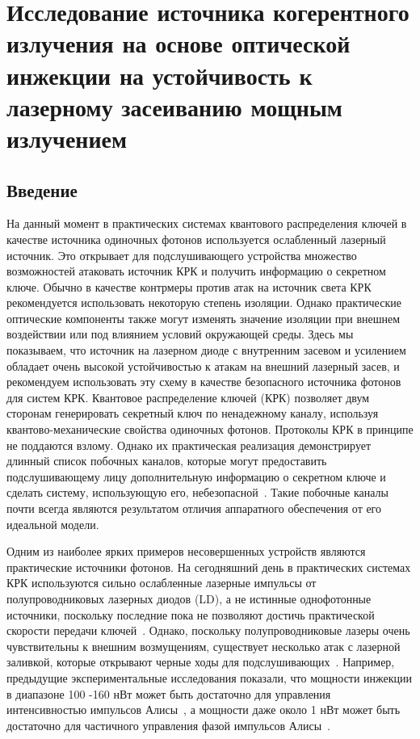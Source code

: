 \chapter{Исследование источника когерентного излучения на основе оптической инжекции на устойчивость к лазерному засеиванию мощным излучением}\label{ch:ch5}
\section{Введение}
На данный момент в практических системах квантового распределения ключей в качестве источника одиночных фотонов используется ослабленный лазерный источник. Это открывает для подслушивающего устройства множество возможностей атаковать источник КРК и получить информацию о секретном ключе. Обычно в качестве контрмеры против атак на источник света КРК рекомендуется использовать некоторую степень изоляции. Однако практические оптические компоненты также могут изменять значение изоляции при внешнем воздействии или под влиянием условий окружающей среды. Здесь мы показываем, что источник на лазерном диоде с внутренним засевом и усилением обладает очень высокой устойчивостью к атакам на внешний лазерный засев, и рекомендуем использовать эту схему в качестве безопасного источника фотонов для систем КРК.
Квантовое распределение ключей (КРК) позволяет двум сторонам генерировать секретный ключ по ненадежному каналу, используя квантово-механические свойства одиночных фотонов. Протоколы КРК в принципе не поддаются взлому. Однако их практическая реализация демонстрирует длинный список побочных каналов, которые могут предоставить подслушивающему лицу дополнительную информацию о секретном ключе и сделать систему, использующую его, небезопасной~\cite{sun2022, makarov2023}. Такие побочные каналы почти всегда являются результатом отличия аппаратного обеспечения от его идеальной модели. 

Одним из наиболее ярких примеров несовершенных устройств являются практические источники фотонов. На сегодняшний день в практических системах КРК используются сильно ослабленные лазерные импульсы от полупроводниковых лазерных диодов (LD), а не истинные однофотонные источники, поскольку последние пока не позволяют достичь практической скорости передачи ключей~\cite{zahidy2024}.
Однако, поскольку полупроводниковые лазеры очень чувствительны к внешним возмущениям, существует несколько атак с лазерной заливкой, которые открывают черные ходы для подслушивающих~\cite{huang2019, pang2020, lovic2023}. Например, предыдущие экспериментальные исследования показали, что мощности инжекции в диапазоне 100 -160 нВт может быть достаточно для управления интенсивностью импульсов Алисы~\cite{huang2019, pang2020}, а мощности даже около 1 нВт может быть достаточно для частичного управления фазой импульсов Алисы~\cite{lovic2023}.

